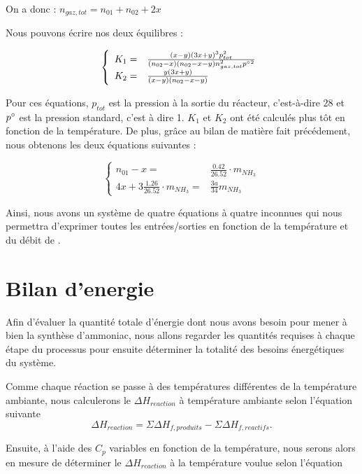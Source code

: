 On a donc : $n_{gaz,tot} = n_{01} + n_{02} + 2x$ 
  
Nous pouvons écrire nos deux équilibres : 
 
$$
	\left\{
		\begin{array}{rl}
			K_1 =& \frac{(x-y)(3x+y)^3p_{tot}^2}{(n_{02}-x)(n_{02}-x-y)n_{gaz,tot}^2{p^{\circ}}^2} \\
			K_2 =& \frac{y(3x+y)}{(x-y)(n_{02}-x-y)}
		\end{array}
	\right.
$$

Pour ces équations, $p_{tot}$ est la pression à la sortie du réacteur, c'est-à-dire \unit{28}{\bbar}
et $p^{\circ}$ est la pression standard, c'est à dire \unit{1}{\bbar}.
$K_1$ et $K_2$ ont été calculés plus tôt en fonction de la température. 
De plus, grâce au bilan de matière fait précédement, nous obtenons les deux équations suivantes :

$$
	\left\{
		\begin{array}{rl}
			n_{01} - x =& \frac{0.42}{26.52} \cdot m_{NH_3} \\
			4x + 3\frac{1.26}{26.52}\cdot m_{NH_3} =& \frac{3a}{34}m_{NH_3}
		\end{array}
	\right.
$$
 
Ainsi, nous avons un système de quatre équations à quatre inconnues qui nous permettra d'exprimer
toutes les entrées/sorties en fonction de la température et du débit de . 
   
\section{Bilan d'energie}
Afin d'évaluer la quantité totale d'énergie dont nous avons besoin pour mener à 
bien la synthèse d'ammoniac, nous allons regarder les quantités requises à chaque 
étape du processus pour ensuite déterminer la totalité des besoins énergétiques du
système.

Comme chaque réaction se passe à des températures différentes de la température ambiante,
nous calculerons le $\Delta H_{reaction}$ à température ambiante selon l'équation suivante 
$$\Delta H_{reaction} = \Sigma \Delta H_{f,produits} - \Sigma \Delta H_{f,reactifs}.$$

Ensuite, à l'aide des $C_{p}$ variables en fonction de la température, nous serons alors en 
mesure de déterminer le $\Delta H_{reaction}$ à la température voulue selon l'équation

